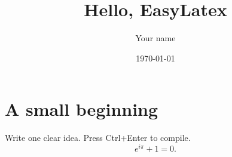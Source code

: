 \documentclass[11pt]{article}
\title{Hello, EasyLatex}
\author{Your name}
\date{\today}
\begin{document}
\maketitle
\section{A small beginning}
Write one clear idea. Press Ctrl+Enter to compile.
\begin{equation}
  e^{i\pi}+1=0.
\end{equation}
\end{document}
